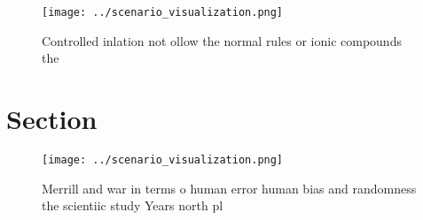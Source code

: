 \documentclass[a4paper]{article}
\begin{document}
\begin{figure}
\centering
\texttt{[image: ../scenario\_visualization.png]}
\caption{Controlled inlation not ollow the normal rules or ionic compounds the
}
\end{figure}
 
\section{Section}

\begin{figure}
\centering
\texttt{[image: ../scenario\_visualization.png]}
\caption{Merrill and war in terms o human error human bias and randomness the scientiic study Years north pl
}
\end{figure}
 
\end{document}
